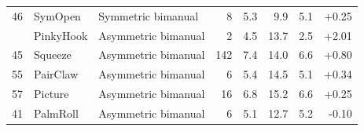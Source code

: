 \begin{table}[h]
\begin{tabular}{rllrrrrr}
46 & SymOpen & Symmetric bimanual & 8 & 5.3 & 9.9 & 5.1 & +0.25 \\
\addlinespace[3pt]
43 & PinkyHook & Asymmetric bimanual & 2 & 4.5 & 13.7 & 2.5 & +2.01 \\
45 & Squeeze & Asymmetric bimanual & 142 & 7.4 & 14.0 & 6.6 & +0.80 \\
55 & PairClaw & Asymmetric bimanual & 6 & 5.4 & 14.5 & 5.1 & +0.34 \\
57 & Picture & Asymmetric bimanual & 16 & 6.8 & 15.2 & 6.6 & +0.25 \\
41 & PalmRoll & Asymmetric bimanual & 6 & 5.1 & 12.7 & 5.2 & -0.10 \\
\bottomrule
\end{tabular}
\end{table}